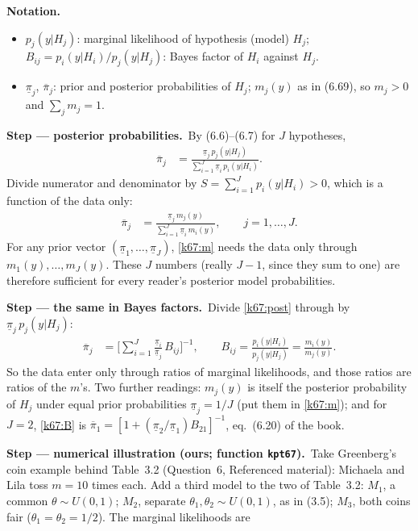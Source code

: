 \documentclass[11pt,a4paper]{article}
\newenvironment{notacao}{\par\smallskip\noindent\textbf{Notation.}\begin{itemize}[leftmargin=1.4em,topsep=1pt,itemsep=0pt]\small}{\end{itemize}}
\newcommand{\passo}[2]{\par\smallskip\noindent\textbf{Step --- #1.}~#2}
\begin{document}
\begin{sol}
\begin{notacao}
\item $p_j(y|H_j)$: marginal likelihood of hypothesis (model) $H_j$; $B_{ij}=p_i(y|H_i)/p_j(y|H_j)$: Bayes factor of $H_i$ against $H_j$.
\item $\underline\pi_j$, $\overline\pi_j$: prior and posterior probabilities of $H_j$; $m_j(y)$ as in (6.69), so $m_j>0$ and $\sum_jm_j=1$.
\end{notacao}
\passo{posterior probabilities}{By (6.6)--(6.7) for $J$ hypotheses,
\begin{align}
\overline\pi_j&=\frac{\underline\pi_j\,p_j(y|H_j)}{\sum_{i=1}^J\underline\pi_i\,p_i(y|H_i)}.\label{k67:post}
\end{align}
Divide numerator and denominator by $S=\sum_{i=1}^Jp_i(y|H_i)>0$, which is a function of the data only:
\begin{align}
\overline\pi_j&=\frac{\underline\pi_j\,m_j(y)}{\sum_{i=1}^J\underline\pi_i\,m_i(y)},\qquad j=1,\ldots,J.\label{k67:m}
\end{align}
For any prior vector $(\underline\pi_1,\ldots,\underline\pi_J)$, \eqref{k67:m} needs the data only through $m_1(y),\ldots,m_J(y)$. These $J$ numbers (really $J-1$, since they sum to one) are therefore sufficient for every reader's posterior model probabilities.}
\passo{the same in Bayes factors}{Divide \eqref{k67:post} through by $\underline\pi_j\,p_j(y|H_j)$:
\begin{align}
\overline\pi_j&=\Big[\sum_{i=1}^J\frac{\underline\pi_i}{\underline\pi_j}\,B_{ij}\Big]^{-1},\qquad B_{ij}=\frac{p_i(y|H_i)}{p_j(y|H_j)}=\frac{m_i(y)}{m_j(y)}.\label{k67:B}
\end{align}
So the data enter only through ratios of marginal likelihoods, and those ratios are ratios of the $m$'s. Two further readings: $m_j(y)$ is itself the posterior probability of $H_j$ under equal prior probabilities $\underline\pi_j=1/J$ (put them in \eqref{k67:m}); and for $J=2$, \eqref{k67:B} is $\overline\pi_1=[1+(\underline\pi_2/\underline\pi_1)B_{21}]^{-1}$, eq.~(6.20) of the book.}
\passo{numerical illustration (ours; function \texttt{kpt67})}{Take Greenberg's coin example behind Table~3.2 (Question~6, Referenced material): Michaela and Lila toss $m=10$ times each. Add a third model to the two of Table~3.2: $M_1$, a common $\theta\sim U(0,1)$; $M_2$, separate $\theta_1,\theta_2\sim U(0,1)$, as in (3.5); $M_3$, both coins fair ($\theta_1=\theta_2=1/2$). The marginal likelihoods are
\begin{align}

\end{align}}
\end{sol}
\end{document}
